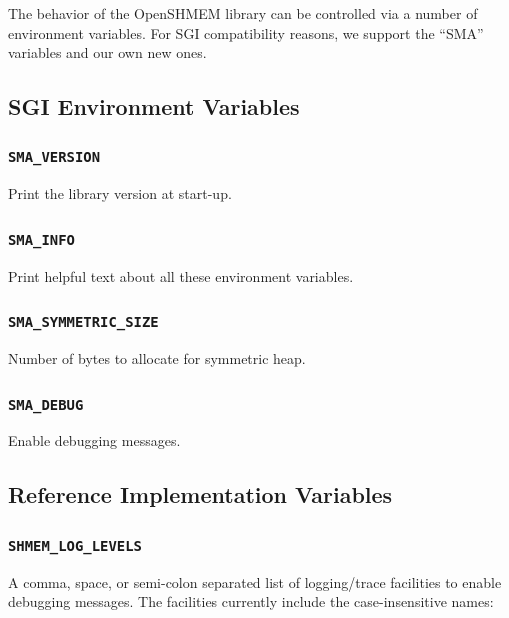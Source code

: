 \documentclass[english]{article}
\newcommand{\openshmem} {\mbox{OpenSHMEM}\xspace}
\begin{document}
The behavior of the \openshmem library can be controlled via a number
of environment variables. For SGI compatibility reasons, we support
the ``SMA'' variables and our own new ones.

\subsection{SGI Environment Variables}

\subsubsection*{\texttt{SMA\_VERSION}}

Print the library version at start-up.

\subsubsection*{\texttt{SMA\_INFO}}

Print helpful text about all these environment variables.

\subsubsection*{\texttt{SMA\_SYMMETRIC\_SIZE}}

Number of bytes to allocate for symmetric heap.

\subsubsection*{\texttt{SMA\_DEBUG}}

Enable debugging messages.

\subsection{Reference Implementation Variables}

\subsubsection*{\texttt{SHMEM\_LOG\_LEVELS}}

A comma, space, or semi-colon separated list of logging/trace
facilities to enable debugging messages. The facilities currently
include the case-insensitive names:
\end{document}
